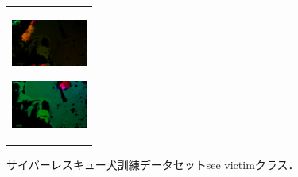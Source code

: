 \begin{enumerate}
\begin{end}
\begin{figure}[H]
\begin{tabular}{l}
      \begin{minipage}{0.165\hsize}
        \begin{center}
          \includegraphics[clip, width=2.5cm]{./Figures/optic_seevictim4.eps}
          \hspace{0.1cm} { }
        \end{center}
      \end{minipage}
      \begin{minipage}{0.165\hsize}
        \begin{center}
          \includegraphics[clip, width=2.5cm]{./Figures/optic_seevictim5.eps}
          \hspace{2.2cm} { }
        \end{center}
      \end{minipage}
    \end{tabular}
    \caption{サイバーレスキュー犬訓練データセットsee victimクラス．}
    \label{seevictim}
\end{figure}

\begin{figure}[H]
    \begin{tabular}{l}


\\ %


\end{tabular}
\end{figure}
\end{end}
\end{enumerate}
